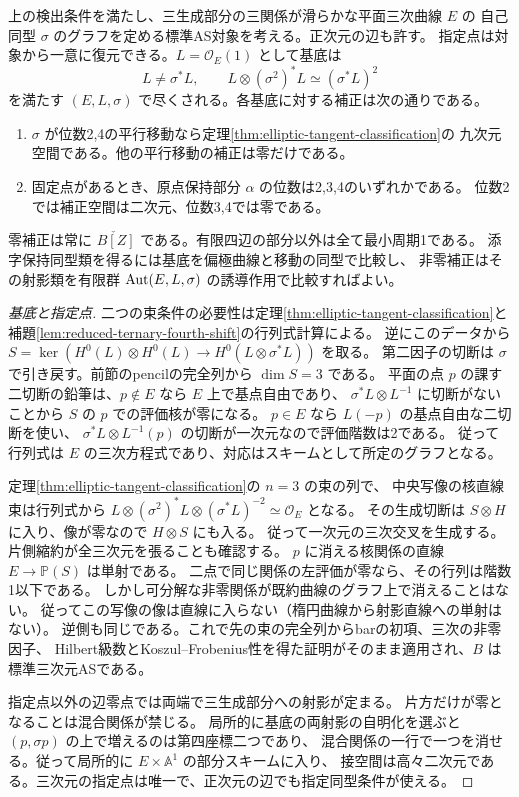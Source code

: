 \begin{theorem}\label{thm:all-elliptic-ore-windows}
上の検出条件を満たし、三生成部分の三関係が滑らかな平面三次曲線 $E$ の
自己同型 $\sigma$ のグラフを定める標準AS対象を考える。正次元の辺も許す。
指定点は対象から一意に復元できる。$L=\mathcal O_E(1)$ として基底は
\[
        L\ne\sigma^* L,\qquad L\otimes(\sigma^2)^*L\simeq(\sigma^*L)^2
\]
を満たす $(E,L,\sigma)$ で尽くされる。各基底に対する補正は次の通りである。
\begin{enumerate}
\item $\sigma$ が位数2,4の平行移動なら定理\ref{thm:elliptic-tangent-classification}の
九次元空間である。他の平行移動の補正は零だけである。
\item 固定点があるとき、原点保持部分 $\alpha$ の位数は2,3,4のいずれかである。
位数2では補正空間は二次元、位数3,4では零である。
\end{enumerate}
零補正は常に $\check{B[Z]}$ である。有限四辺の部分以外は全て最小周期1である。
添字保持同型類を得るには基底を偏極曲線と移動の同型で比較し、
非零補正はその射影類を有限群 $\operatorname{Aut}(E,L,\sigma)$ の誘導作用で比較すればよい。
\end{theorem}
\begin{proof}[基底と指定点]
二つの束条件の必要性は定理\ref{thm:elliptic-tangent-classification}と
補題\ref{lem:reduced-ternary-fourth-shift}の行列式計算による。
逆にこのデータから $S=\ker(H^0(L)\otimes H^0(L)\to H^0(L\otimes\sigma^*L))$ を取る。
第二因子の切断は $\sigma$ で引き戻す。前節のpencilの完全列から $\dim S=3$ である。
平面の点 $p$ の課す二切断の鉛筆は、$p\notin E$ なら $E$ 上で基点自由であり、
$\sigma^*L\otimes L^{-1}$ に切断がないことから $S$ の $p$ での評価核が零になる。
$p\in E$ なら $L(-p)$ の基点自由な二切断を使い、
$\sigma^*L\otimes L^{-1}(p)$ の切断が一次元なので評価階数は2である。
従って行列式は $E$ の三次方程式であり、対応はスキームとして所定のグラフとなる。

定理\ref{thm:elliptic-tangent-classification}の $n=3$ の束の列で、
中央写像の核直線束は行列式から
$L\otimes(\sigma^2)^*L\otimes(\sigma^*L)^{-2}\simeq\mathcal O_E$ となる。
その生成切断は $S\otimes H$ に入り、像が零なので $H\otimes S$ にも入る。
従って一次元の三次交叉を生成する。片側縮約が全三次元を張ることも確認する。
$p$ に消える核関係の直線 $E\to\mathbb P(S)$ は単射である。
二点で同じ関係の左評価が零なら、その行列は階数1以下である。
しかし可分解な非零関係が既約曲線のグラフ上で消えることはない。
従ってこの写像の像は直線に入らない（楕円曲線から射影直線への単射はない）。
逆側も同じである。これで先の束の完全列からbarの初項、三次の非零因子、
Hilbert級数とKoszul--Frobenius性を得た証明がそのまま適用され、$B$ は標準三次元ASである。

指定点以外の辺零点では両端で三生成部分への射影が定まる。
片方だけが零となることは混合関係が禁じる。
局所的に基底の両射影の自明化を選ぶと $(p,\sigma p)$ の上で増えるのは第四座標二つであり、
混合関係の一行で一つを消せる。従って局所的に $E\times\mathbb A^1$ の部分スキームに入り、
接空間は高々二次元である。三次元の指定点は唯一で、正次元の辺でも指定同型条件が使える。
\end{proof}


